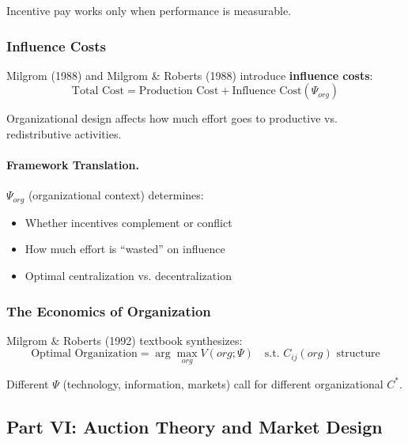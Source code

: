 Incentive pay works only when performance is measurable.

\subsubsection{Influence Costs}

Milgrom (1988) and Milgrom \& Roberts (1988) introduce \textbf{influence costs}:
\begin{equation}
\text{Total Cost} = \text{Production Cost} + \text{Influence Cost}(\Psi_{org})
\end{equation}

Organizational design affects how much effort goes to productive vs. 
redistributive activities.

\paragraph{Framework Translation.}
$\Psi_{org}$ (organizational context) determines:
\begin{itemize}
    \item Whether incentives complement or conflict
    \item How much effort is ``wasted'' on influence
    \item Optimal centralization vs. decentralization
\end{itemize}

\subsubsection{The Economics of Organization}

Milgrom \& Roberts (1992) textbook synthesizes:
\begin{equation}
\text{Optimal Organization} = \arg\max_{org} V(org; \Psi) \quad \text{s.t. } C_{ij}(org) \text{ structure}
\end{equation}

Different $\Psi$ (technology, information, markets) call for different organizational $C^*$.

\subsection{Part VI: Auction Theory and Market Design}

